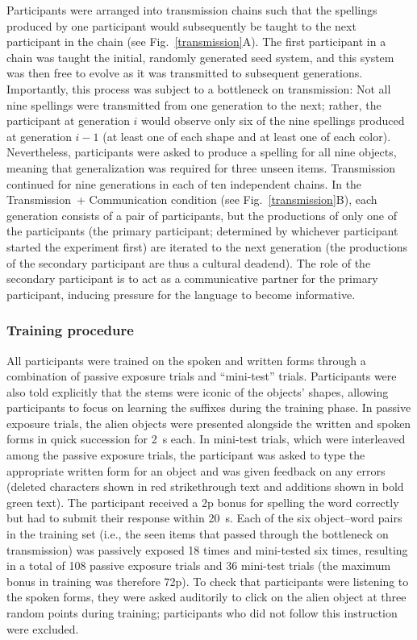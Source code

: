 \documentclass[doc,biblatex]{apa7}
\begin{document}
Participants were arranged into transmission chains such that the spellings produced by one participant would subsequently be taught to the next participant in the chain (see Fig.~\ref{transmission}A). The first participant in a chain was taught the initial, randomly generated seed system, and this system was then free to evolve as it was transmitted to subsequent generations. Importantly, this process was subject to a bottleneck on transmission: Not all nine spellings were transmitted from one generation to the next; rather, the participant at generation $i$ would observe only six of the nine spellings produced at generation $i-1$ (at least one of each shape and at least one of each color). Nevertheless, participants were asked to produce a spelling for all nine objects, meaning that generalization was required for three unseen items. Transmission continued for nine generations in each of ten independent chains. In the Transmission~+ Communication condition (see Fig.~\ref{transmission}B), each generation consists of a pair of participants, but the productions of only one of the participants (the primary participant; determined by whichever participant started the experiment first) are iterated to the next generation (the productions of the secondary participant are thus a cultural deadend). The role of the secondary participant is to act as a communicative partner for the primary participant, inducing pressure for the language to become informative.

\subsubsection{Training procedure}

All participants were trained on the spoken and written forms through a combination of passive exposure trials and ``mini-test'' trials. Participants were also told explicitly that the stems were iconic of the objects' shapes, allowing participants to focus on learning the suffixes during the training phase. In passive exposure trials, the alien objects were presented alongside the written and spoken forms in quick succession for 2~s each. In mini-test trials, which were interleaved among the passive exposure trials, the participant was asked to type the appropriate written form for an object and was given feedback on any errors (deleted characters shown in red strikethrough text and additions shown in bold green text). The participant received a 2p bonus for spelling the word correctly but had to submit their response within 20~s. Each of the six object--word pairs in the training set (i.e., the seen items that passed through the bottleneck on transmission) was passively exposed 18 times and mini-tested six times, resulting in a total of 108 passive exposure trials and 36 mini-test trials (the maximum bonus in training was therefore 72p). To check that participants were listening to the spoken forms, they were asked auditorily to click on the alien object at three random points during training; participants who did not follow this instruction were excluded.
\end{document}

